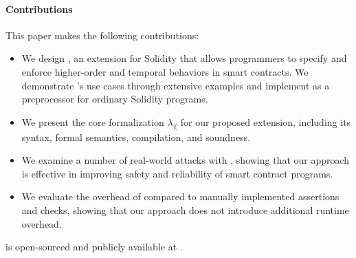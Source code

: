 \paragraph{Contributions} This paper makes the following contributions:
\begin{itemize}
  \item We design \lang, an extension for Solidity that allows programmers to
        specify and enforce higher-order and temporal behaviors in smart contracts.
        We demonstrate \lang's use cases through extensive examples and
        implement \lang as a preprocessor for ordinary Solidity programs.
	\item We present the core formalization $\lambda_\lang$ for our proposed
	      extension, including its syntax, formal semantics, compilation, and
	      soundness.
  \item We examine a number of real-world attacks with \lang, showing that our
        approach is effective in improving safety and reliability of smart contract
        programs.
  \item We evaluate the overhead of \lang compared to manually implemented
        assertions and checks, showing that our approach does not introduce
        additional runtime overhead.
\end{itemize}

\lang is open-sourced and publicly available at .

